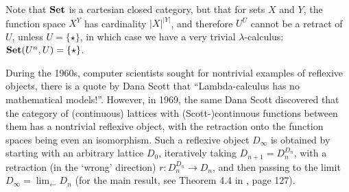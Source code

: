 \begin{remark}
  Note that $ \mathbf{Set} $ is a cartesian closed category, but that for sets $ X $ and $ Y $, the function space $ X^Y $ has cardinality $ \vert X \vert^{\vert Y \vert} $, and therefore $ U^U $ cannot be a retract of $ U $, unless $ U = \{ \star \} $, in which case we have a very trivial $ \lambda $-calculus: $ \mathbf{Set}(U^n, U) = \{ \star \} $.

  During the 1960s, computer scientists sought for nontrivial examples of reflexive objects, there is a quote by Dana Scott that ``Lambda-calculus has no mathematical models!''\cite{strachey}. However, in 1969, the same Dana Scott discovered that the category of (continuous) lattices with (Scott-)continuous functions between them has a nontrivial reflexive object, with the retraction onto the function spaces being even an isomorphism. Such a reflexive object $ D_\infty $ is obtained by starting with an arbitrary lattice $ D_0 $, iteratively taking $ D_{n + 1} = D_n^{D_n} $, with a retraction (in the `wrong' direction) $ r: D_n^{D_n} \to D_n $, and then passing to the limit $ D_\infty = \lim_{\leftarrow} D_n $ (for the main result, see Theorem 4.4 in \cite{scott-continuous}, page 127).
\end{remark}

